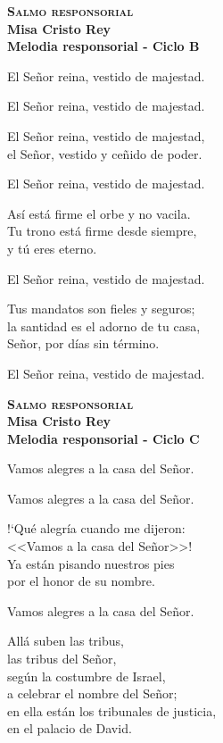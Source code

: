 \documentclass[letterpaper]{report}
\begin{document}
    \begin{center}
        {\scshape \Huge {\bfseries Salmo responsorial}} \\
        {\LARGE {\bfseries Misa Cristo Rey}} \\
        {\Large {\bfseries Melodia responsorial - Ciclo B}}
    \end{center}
    
    El Se\~nor reina, vestido de majestad.
    
    El Se\~nor reina, vestido de majestad.

    El Se\~nor reina, vestido de majestad,\\
    el Se\~nor, vestido y ce\~nido de poder.

    El Se\~nor reina, vestido de majestad.

    As\'i est\'a firme el orbe y no vacila.\\
    Tu trono est\'a firme desde siempre,\\
    y t\'u eres eterno.

    El Se\~nor reina, vestido de majestad.

    Tus mandatos son fieles y seguros;\\
    la santidad es el adorno de tu casa,\\
    Se\~nor, por d\'ias sin t\'ermino.

    El Se\~nor reina, vestido de majestad.
    \clearpage
    
    \begin{center}
        {\scshape \Huge {\bfseries Salmo responsorial}} \\
        {\LARGE {\bfseries Misa Cristo Rey}} \\
        {\Large {\bfseries Melodia responsorial - Ciclo C}}
    \end{center}
    
    Vamos alegres a la casa del Se\~nor.
    
    Vamos alegres a la casa del Se\~nor.

    !`Qu\'e alegr\'ia cuando me dijeron:\\
    <<Vamos a la casa del Se\~nor>>!\\
    Ya est\'an pisando nuestros pies\\
    por el honor de su nombre.

    Vamos alegres a la casa del Se\~nor.

    All\'a suben las tribus,\\
    las tribus del Se\~nor,\\
    seg\'un la costumbre de Israel,\\
    a celebrar el nombre del Se\~nor;\\
    en ella est\'an los tribunales de justicia,\\
    en el palacio de David.
\end{document}
